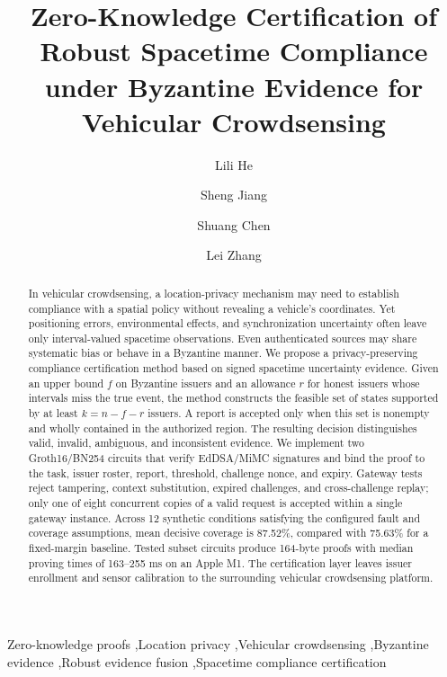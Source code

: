 \documentclass[preprint,12pt,authoryear]{elsarticle}
\begin{document}
\begin{frontmatter}
\title{Zero-Knowledge Certification of Robust Spacetime Compliance under Byzantine Evidence for Vehicular Crowdsensing}
\author[univ]{Lili He}
\author[univ]{Sheng Jiang}
\author[univ]{Shuang Chen}
\author[univ]{Lei Zhang}
\address[univ]{College of Information and Electronic Technology, Jiamusi University, Jiamusi 154007, China}
\begin{abstract}
In vehicular crowdsensing, a location-privacy mechanism may need to establish compliance with a spatial policy without revealing a vehicle's coordinates. Yet positioning errors, environmental effects, and synchronization uncertainty often leave only interval-valued spacetime observations. Even authenticated sources may share systematic bias or behave in a Byzantine manner. We propose a privacy-preserving compliance certification method based on signed spacetime uncertainty evidence. Given an upper bound $f$ on Byzantine issuers and an allowance $r$ for honest issuers whose intervals miss the true event, the method constructs the feasible set of states supported by at least $k = n - f - r$ issuers. A report is accepted only when this set is nonempty and wholly contained in the authorized region. The resulting decision distinguishes valid, invalid, ambiguous, and inconsistent evidence. We implement two Groth16/BN254 circuits that verify EdDSA/MiMC signatures and bind the proof to the task, issuer roster, report, threshold, challenge nonce, and expiry. Gateway tests reject tampering, context substitution, expired challenges, and cross-challenge replay; only one of eight concurrent copies of a valid request is accepted within a single gateway instance. Across 12 synthetic conditions satisfying the configured fault and coverage assumptions, mean decisive coverage is 87.52\%, compared with 75.63\% for a fixed-margin baseline. Tested subset circuits produce 164-byte proofs with median proving times of 163--255 ms on an Apple M1. The certification layer leaves issuer enrollment and sensor calibration to the surrounding vehicular crowdsensing platform.
\end{abstract}
\begin{keyword}
Zero-knowledge proofs \sep Location privacy \sep Vehicular crowdsensing \sep Byzantine evidence \sep Robust evidence fusion \sep Spacetime compliance certification
\end{keyword}
\end{frontmatter}












\end{document}
